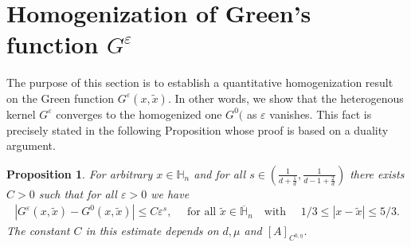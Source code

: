 \documentclass[11pt, reqno]{amsart}
\newtheorem{proposition}[theorem]{Proposition}
\theoremstyle{definition}
\theoremstyle{remark}
\numberwithin{equation}{section}
\begin{document}
	
	
	
	
	\section{Homogenization of  Green's function $G^\varepsilon$}\label{section_hom_G}
	
	
	\noindent	The purpose of this section is to establish a quantitative homogenization result on the  Green function $G^\varepsilon(x,\tilde{x})$. In other words, we show that the heterogenous kernel $G^\varepsilon$ converges to the homogenized one $G^0($ as $\varepsilon$ vanishes. This fact is precisely stated in the following Proposition whose proof is based on a duality argument.
	\begin{proposition}\label{propo_GepsG0}
		For arbitrary $x\in\mathbb{H}_n$ and for all $s\in \left(\frac{1}{d+\frac{1}{d}},  \frac{1}{d-1 +\frac{2}{d}}\right)$ there exists $C>0$  such that for all $\varepsilon> 0$ we have
		\begin{align*}
			|G^\varepsilon(x,\tilde{x}) - G^0(x,\tilde{x}) | \leq C \varepsilon^s, \quad \mbox{ for all } \tilde{x}\in \overline{\mathbb{H}}_n \quad \mbox{with }\quad 1/3\leq |x-\tilde{x}|\leq 5/3.
		\end{align*}
		The constant $C$ in this estimate depends on $d,\mu$ and $[A]_{C^{0,\eta}} $.  
	\end{proposition}
	
\end{document}
